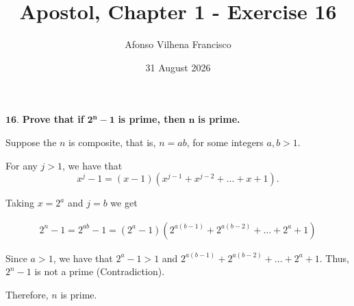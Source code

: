 \documentclass{article}
\title{Apostol, Chapter 1 - Exercise 16}
\author{Afonso Vilhena Francisco}
\date{31 August 2026}
\begin{document}
\maketitle

$\mathbf{16.}$ \textbf{Prove that if} $\mathbf{2^n-1}$ \textbf{is prime, then} $\mathbf{n}$ \textbf{is prime.}

\vspace{0.5cm}

Suppose the $n$ is composite, that is, $n=ab$, for some integers $a,b>1.$

For any $j>1$, we have that $$x^j-1=(x-1)(x^{j-1}+x^{j-2}+...+x+1).$$

Taking $x=2^a$ and $j=b$ we get

\begin{align*}
    2^n-1 = 2^{ab}-1 = (2^a-1)(2^{a(b-1)}+2^{a(b-2)}+...+2^a+1)
\end{align*}

Since $a>1$, we have that $2^a-1>1$ and $2^{a(b-1)}+2^{a(b-2)}+...+2^a+1$. Thus, $2^n-1$ is not a prime (Contradiction).

Therefore, $n$ is prime.
\end{document}
